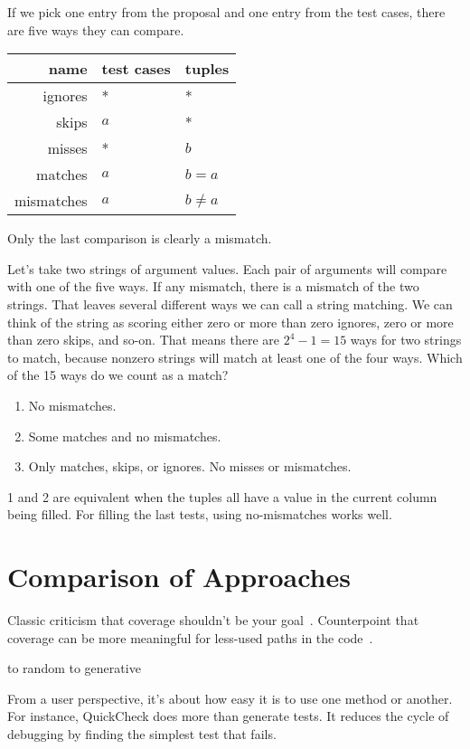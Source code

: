 \documentclass{juliacon}
\begin{document}
\vskip 6pt
If we pick one entry from the proposal and one entry from the test cases, there are five ways they can compare.
\begin{center}
\begin{tabular}{rll}
name & test cases & tuples \\ \hline
ignores & * & * \\
skips & $a$ & * \\
misses & * & $b$ \\
matches & $a$ & $b=a$ \\
mismatches & $a$ & $b\ne a$
\end{tabular}
\end{center}
Only the last comparison is clearly a mismatch.

\vskip 6pt
Let's take two strings of argument values. Each pair of arguments will compare with one of the five ways. If any mismatch, there is a mismatch of the two strings. That leaves several different ways we can call a string matching. We can think of the string as scoring either zero or more than zero ignores, zero or more than zero skips, and so-on. That means there are $2^4-1 = 15$ ways for two strings to match, because nonzero strings will match at least one of the four ways. Which of the 15 ways do we count as a match?


\begin{enumerate}
   \item No mismatches.
   \item Some matches and no mismatches.
   \item Only matches, skips, or ignores. No misses or mismatches.
\end{enumerate}

\vskip 6pt
1 and 2 are equivalent when the tuples all have a value in the current column being filled.
For filling the last tests, using no-mismatches works well.

\section{Comparison of Approaches}
Classic criticism that coverage shouldn't be your goal~\cite{Inozemtseva2014-gz}. Counterpoint that coverage can be more meaningful for less-used paths in the code~\cite{Cai2005-ex}.

\vskip 6pt
to random
to generative

\vskip 6pt
From a user perspective, it's about how easy it is to use one method or another. For instance, QuickCheck does more than generate tests. It reduces the cycle of debugging by finding the simplest test that fails.
\end{document}
